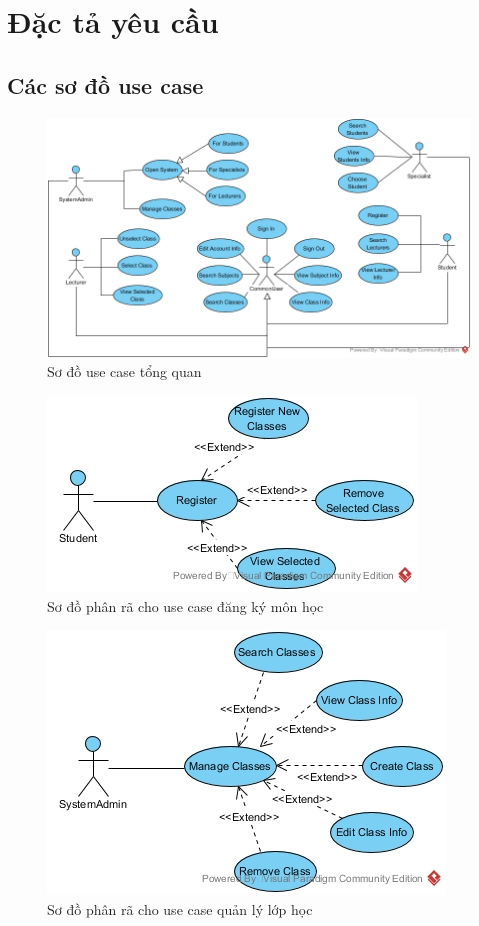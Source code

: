 \documentclass[12pt]{book}
\begin{document}
\chapter{Đặc tả yêu cầu}

  \section{Các sơ đồ use case}

  \FloatBarrier
  \begin{figure}[ht]
    \centering
    \includegraphics[scale=0.4]{../pictures/projectdiagrams/uc.jpg}
    \caption{Sơ đồ use case tổng quan}
  \end{figure}
  \FloatBarrier

  \FloatBarrier
  \begin{figure}[ht]
    \centering
    \includegraphics[scale=0.6]{../pictures/projectdiagrams/Register-uc-destructing.jpg}
    \caption{Sơ đồ phân rã cho use case đăng ký môn học}
  \end{figure}
  \FloatBarrier

  \FloatBarrier
  \begin{figure}[ht]
    \centering
    \includegraphics[scale=0.6]{../pictures/projectdiagrams/Manage-Classes-uc-destructing.jpg}
    \caption{Sơ đồ phân rã cho use case quản lý lớp học}
  \end{figure}
  \FloatBarrier
\end{document}
